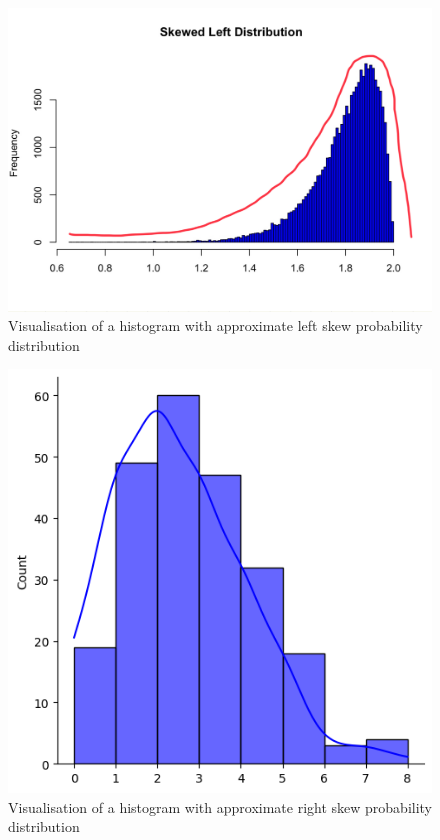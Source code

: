 \begin{figure}[H]
 \centering
 \includegraphics[scale=0.15]{Section1/img/HisL.jpg}
 \caption{Visualisation of a histogram with approximate left skew probability distribution}
\end{figure}

\begin{figure}[H]
 \centering
 \includegraphics[scale=0.35]{Section1/img/HisR.jpg}
 \caption{Visualisation of a histogram with approximate right skew probability distribution}
\end{figure}

